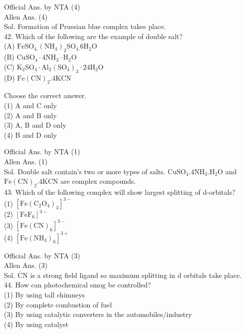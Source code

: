 \documentclass[10pt]{article}
\begin{document}
Official Ans. by NTA (4)\\
Allen Ans. (4)\\
Sol. Formation of Prussian blue complex takes place.\\
42. Which of the following are the example of double salt?\\
(A) \(\mathrm{FeSO}_{4 .}\left(\mathrm{NH}_{4}\right)_{2} \mathrm{SO}_{4 .} 6 \mathrm{H}_{2} \mathrm{O}\)\\
(B) \(\mathrm{CuSO}_{4} \cdot 4 \mathrm{NH}_{3} \cdot \mathrm{H}_{2} \mathrm{O}\)\\
(C) \(\mathrm{K}_{2} \mathrm{SO}_{4} \cdot \mathrm{Al}_{2}\left(\mathrm{SO}_{4}\right)_{3} \cdot 24 \mathrm{H}_{2} \mathrm{O}\)\\
(D) \(\mathrm{Fe}(\mathrm{CN})_{2} .4 \mathrm{KCN}\)

Choose the correct answer.\\
(1) A and C only\\
(2) A and B only\\
(3) A, B and D only\\
(4) B and D only

Official Ans. by NTA (1)\\
Allen Ans. (1)\\
Sol. Double salt contain's two or more types of salts. \(\mathrm{CuSO}_{4} .4 \mathrm{NH}_{3} . \mathrm{H}_{2} \mathrm{O}\) and \(\mathrm{Fe}(\mathrm{CN})_{2} .4 \mathrm{KCN}\) are complex compounds.\\
43. Which of the following complex will show largest splitting of d-orbitals?\\
(1) \(\left[\mathrm{Fe}\left(\mathrm{C}_{2} \mathrm{O}_{4}\right)_{3}\right]^{3-}\)\\
(2) \(\left[\mathrm{FeF}_{6}\right]^{3-}\)\\
(3) \(\left[\mathrm{Fe}(\mathrm{CN})_{6}\right]^{3-}\)\\
(4) \(\left[\mathrm{Fe}\left(\mathrm{NH}_{3}\right)_{6}\right]^{3+}\)

Official Ans. by NTA (3)\\
Allen Ans. (3)\\
Sol. \(\overline{\mathrm{C}} \mathrm{N}\) is a strong field ligand so maximum splitting in d orbitals take place.\\
44. How can photochemical smog be controlled?\\
(1) By using tall chimneys\\
(2) By complete combustion of fuel\\
(3) By using catalytic converters in the automobiles/industry\\
(4) By using catalyst
\end{document}
